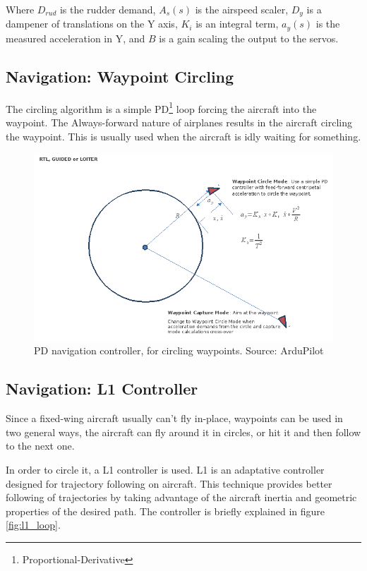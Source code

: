 Where $D_{rud}$ is the rudder demand, $A_s(s)$ is the airspeed scaler, $D_y$ is a dampener of translations on the Y axis, $K_i$ is an integral term, $a_y(s)$ is the measured acceleration in Y, and $B$ is a gain scaling the output to the servos.
\subsection{Navigation: Waypoint Circling}

The circling algorithm is a simple PD\footnote{Proportional-Derivative} loop forcing the aircraft into the waypoint. The Always-forward nature of airplanes results in the aircraft circling the waypoint. This is usually used when the aircraft is idly waiting for something.

\begin{figure}[H]
\centering
  \includegraphics[width=0.8\linewidth]{figs/pd_loiter.png}	
  \caption{PD navigation controller, for circling waypoints. Source: ArduPilot}
  \label{fig:pd_loop}
\end{figure}


\subsection{Navigation: L1 Controller}

%
%
Since a fixed-wing aircraft usually can't fly in-place, waypoints can be used in two general ways, the aircraft can fly around it in circles, or hit it and then follow to the next one.

In order to circle it, a L1 controller is used. L1 is an adaptative controller designed for trajectory following on aircraft\cite{Park04_GNC}. This technique provides better following of trajectories by taking advantage of the aircraft inertia and geometric properties of the desired path. The controller is briefly explained in figure \ref{fig:l1_loop}.
%
%


